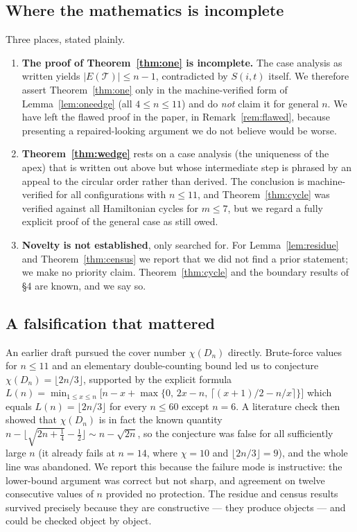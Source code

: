 \documentclass[11pt,a4paper]{article}
\theoremstyle{definition}
\theoremstyle{plain}
\newcommand{\Thr}{\mathcal{T}}
\begin{document}
\subsection{Where the mathematics is incomplete}

Three places, stated plainly.

\begin{enumerate}[leftmargin=*]
\item \textbf{The proof of Theorem~\ref{thm:one} is incomplete.}  The case
analysis as written yields $|E(\Thr)|\le n-1$, contradicted by $S(i,t)$ itself.
We therefore assert Theorem~\ref{thm:one} only in the machine-verified form of
Lemma~\ref{lem:oneedge} (all $4\le n\le11$) and do \emph{not} claim it for
general $n$.  We have left the flawed proof in the paper, in
Remark~\ref{rem:flawed}, because presenting a repaired-looking argument we do not
believe would be worse.
\item \textbf{Theorem~\ref{thm:wedge}} rests on a case analysis (the
uniqueness of the apex) that is written out above but whose intermediate step is
phrased by an appeal to the circular order rather than derived.  The conclusion
is machine-verified for all configurations with $n\le11$, and Theorem~\ref{thm:cycle}
was verified against all Hamiltonian cycles for $m\le7$, but we regard a fully
explicit proof of the general case as still owed.
\item \textbf{Novelty is not established}, only searched for.  For
Lemma~\ref{lem:residue} and Theorem~\ref{thm:census} we report that we did not
find a prior statement; we make no priority claim.  Theorem~\ref{thm:cycle} and
the boundary results of §4 are known, and we say so.
\end{enumerate}

\subsection{A falsification that mattered}

An earlier draft pursued the cover number $\chi(D_n)$ directly.  Brute-force
values for $n\le11$ and an elementary double-counting bound led us to conjecture
$\chi(D_n)=\lfloor2n/3\rfloor$, supported by the explicit formula
$L(n)=\min_{1\le x\le n}\bigl[n-x+\max\{0,\,2x-n,\,
\lceil (x+1)/2-n/x\rceil\}\bigr]$ which equals $L(n)=\lfloor2n/3\rfloor$ for
every $n\le60$ except $n=6$.  A literature check then showed that $\chi(D_n)$ is
in fact the known quantity $n-\lfloor\sqrt{2n+\tfrac14}-\tfrac12\rfloor\sim
n-\sqrt{2n}$, so the conjecture was false for all sufficiently large $n$ (it
already fails at $n=14$, where $\chi=10$ and $\lfloor2n/3\rfloor=9$), and the
whole line was abandoned.  We report this because the failure mode is
instructive: the lower-bound argument was correct but not sharp, and agreement
on twelve consecutive values of $n$ provided no protection.  The residue and
census results survived precisely because they are constructive --- they produce
objects --- and could be checked object by object.
\end{document}
